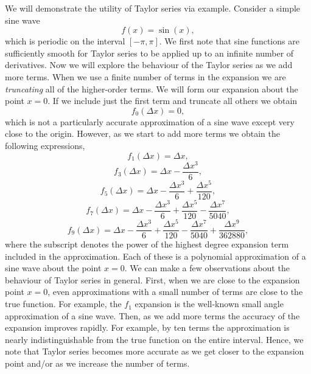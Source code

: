 We will demonstrate the utility of Taylor series via example. Consider a simple sine wave 
\begin{equation}
	f(x) = \sin(x),
\end{equation}
which is periodic on the interval $[- \pi, \pi]$. We first note that sine functions are sufficiently smooth for Taylor series to be applied up to an infinite number of derivatives. Now we will explore the behaviour of the Taylor series as we add more terms. When we use a finite number of terms in the expansion we are {\it truncating} all of the higher-order terms. We will form our expansion about the point $x = 0$. If we include just the first term and truncate all others we obtain
\begin{equation}
	f_0(\Delta x) = 0,
\end{equation}
which is not a particularly accurate approximation of a sine wave except very close to the origin. However, as we start to add more terms we obtain the following expressions,
\begin{equation}
	f_1(\Delta x) = \Delta x,
\end{equation}
\begin{equation}
	f_3(\Delta x) = \Delta x - \frac{\Delta x^3}{6},
\end{equation}
\begin{equation}
	f_5(\Delta x) = \Delta x - \frac{\Delta x^3}{6} + \frac{\Delta x^5}{120},
\end{equation}
\begin{equation}
	f_7(\Delta x) = \Delta x - \frac{\Delta x^3}{6} + \frac{\Delta x^5}{120} - \frac{\Delta x^7}{5040},
\end{equation}
\begin{equation}
	f_{9}(\Delta x) = \Delta x - \frac{\Delta x^3}{6} + \frac{\Delta x^5}{120} - \frac{\Delta x^7}{5040} + \frac{\Delta x^9}{362880},
\end{equation}
where the subscript denotes the power of the highest degree expansion term included in the approximation. Each of these is a polynomial approximation of a sine wave about the point $x=0$. We can make a few observations about the behaviour of Taylor series in general. First, when we are close to the expansion point $x=0$, even approximations with a small number of terms are close to the true function. For example, the $f_1$ expansion is the well-known small angle approximation of a sine wave. Then, as we add more terms the accuracy of the expansion improves rapidly. For example, by ten terms the approximation is nearly indistinguishable from the true function on the entire interval. Hence, we note that Taylor series becomes more accurate as we get closer to the expansion point and/or as we increase the number of terms.

